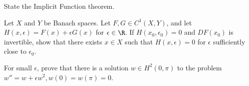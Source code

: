 \begin{alist}
\item State the Implicit Function theorem.
\item Let $X$ and $Y$ be Banach spaces. Let $F, G\in C^1(X,Y)$, and
let $H(x,\epsilon)=F(x)+\epsilon G(x)$ for $\epsilon\in \R$. If
$H(x_0,\epsilon_0)=0$ and $DF(x_0)$ is invertible, show that there
exists $x\in X$ such that $H(x,\epsilon)=0$ for $\epsilon$
sufficiently close to $\epsilon_0$.
\item For small $\epsilon$, prove that there is a solution $w\in
H^2(0,\pi)$ to the problem $w''=w+\epsilon w^2, w(0)=w(\pi)=0$.
\end{alist}

